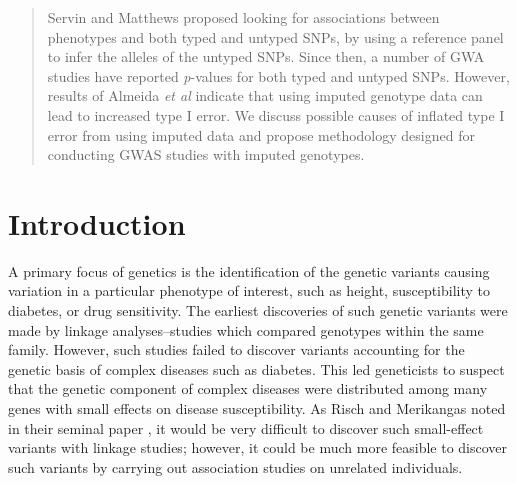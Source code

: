 \documentclass[12pt]{article}
\begin{document}
\maketitle

\newcommand{\tr}{\text{tr}}
\newcommand{\E}{\textbf{E}}
\newcommand{\diag}{\text{diag}}
\newcommand{\argmax}{\text{argmax}}
\newcommand{\Cov}{\text{Cov}}


\begin{abstract}
Servin and Matthews \cite{Servin2007} proposed looking for associations
between phenotypes and both typed and untyped SNPs,
by using a reference panel to infer the alleles of the untyped SNPs.
Since then, a number of GWA studies have reported \emph{p}-values for both
typed and untyped SNPs.
However, results of Almeida \emph{et al}\cite{Almeida2011} indicate
that using imputed genotype data can lead to increased type I error.
We discuss possible causes of inflated type I error from using
imputed data and propose methodology designed for conducting GWAS
studies with imputed genotypes.

\end{abstract}

\section{Introduction}

A primary focus of genetics is the identification of
the genetic variants causing variation in a particular
phenotype of interest, such as height, susceptibility to diabetes,
or drug sensitivity.
The earliest discoveries of such genetic variants were made by 
linkage analyses--studies which compared genotypes within the same
family.
However, such studies failed to discover variants accounting
for the genetic basis of complex diseases such as diabetes.
This led geneticists to suspect that the genetic component of complex diseases
were distributed among many genes with small effects on
disease susceptibility.
As Risch and Merikangas noted in their seminal paper \cite{Risch1996},
it would be very difficult to discover such small-effect variants
with linkage studies; however, it could be much more feasible
to discover such variants by carrying out association studies on
unrelated individuals.
\end{document}

